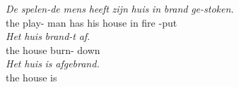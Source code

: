 \begin{exe}
\ex
\begin{xlist}
\ex\label{gloss:prs_ptcp}
\gll \textit{De} \textit{spelen-de} \textit{mens} \textit{heeft} \textit{zijn} \textit{huis} \textit{in} \textit{brand} \textit{ge-stoken.}\\
the play- man has his house in fire -put\\
\ex\label{gloss:svp}
\gll \textit{Het} \textit{huis} \textit{brand-t} \textit{af}.\\
the {house} {burn}- down\\
\ex\label{gloss:pst_ptcp}
\gll \textit{Het} \textit{huis} \textit{is} \textit{af\textlangle ge\textrangle brand.}\\
the {house} {is} \textlangle{}\\
\end{xlist}
\end{exe}

